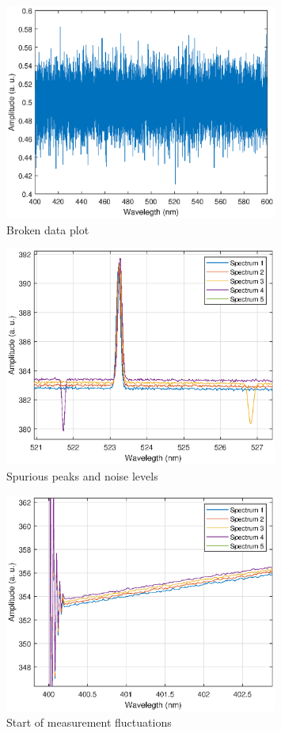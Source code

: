 \begin{figure}[H]
    \centering
    \includegraphics[width = 0.8\textwidth ]{figures/brokenData.eps}
    \caption{Broken data plot}
    \label{fig:Figure 2}
\end{figure}
\begin{figure}[H]
    \centering
    \includegraphics[width = 0.8\textwidth ]{figures/spurius_noise.eps}
    \caption{Spurious peaks and noise levels}
    \label{fig:Figure 3}
\end{figure}
\begin{figure}[H]
    \centering
    \includegraphics[width = 0.8\textwidth ]{figures/startError.eps}
    \caption{Start of measurement fluctuations}
    \label{fig:Figure 4}
\end{figure}
